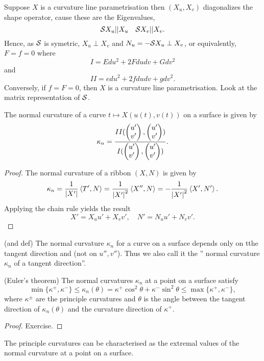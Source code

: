 \begin{remark}
	Suppose $X$ is a curvature line parametrisation then $(X_u,X_v)$ diagonalizes the shape operator, cause these are the Eigenvalues,
		\[ \mathcal S X_u || X_u \quad \mathcal S X_v || X_v. \]
	Hence, as $\mathcal S$ is symetric, $X_u \perp X_v$ and $N_u = -\mathcal S X_u \perp X_v$, or equivalently, $F = f=0$ where
		\[ I = Edu^2 + 2Fdudv + Gdv^2 \]
	and
		\[ II = edu^2 + 2fdudv + gdv^2. \]
	Conversely, if $f=F=0$, then $X$ is a curvature line parametrisation. Look at the matrix representation of $\mathcal S$.
\end{remark}

\begin{lemma}
	The normal curvature of a curve $t \mapsto X(u(t),v(t))$ on a surface is given by 
		\[ \kappa_n = \frac {II(\begin{pmatrix} u'\\v' \end{pmatrix},\begin{pmatrix} u'\\v' \end{pmatrix})}{I (\begin{pmatrix} u'\\v' \end{pmatrix},\begin{pmatrix} u'\\v' \end{pmatrix})}. \]
\end{lemma}

\begin{proof}
	The normal curvature of a ribbon $(X,N)$ is given by
		\[ \kappa_n = \frac 1{\left| X'\right|} \left \langle T',N \right\rangle = \frac 1{\left| X'\right|^2} \left \langle X'',N \right\rangle = -\frac 1{\left| X'\right|^2} \left \langle X',N' \right\rangle. \]
	Applying the chain rule yields the result
		\[ X' = X_uu' + X_vv', \quad N' = N_uu' + N_vv'. \]
\end{proof}

\begin{remark}(and def)
	The normal curvature $\kappa_n$ for a curve on a surface depends only on tthe tangent direction and (not on $u'', v''$). Thus we also call it the '' normal curvature $\kappa_n$ of a tangent direction''.
\end{remark}

\begin{theorem}(Euler's theorem)
	The normal curvatures $\kappa_n$ at a point on a surface satisfy 
		\[ \min \{ \kappa^+,\kappa^- \} \leq \kappa_n (\theta) = \kappa^+ \cos^2 \theta + \kappa^- \sin^2\theta \leq \max \{\kappa^+,\kappa^- \},  \]
	where $\kappa^\pm$ are the principle curvatures and $\theta$ is the angle between the tangent direction of $\kappa_n(\theta)$ and the curvature direction of $\kappa^+$.
\end{theorem}

\begin{proof}
	Exercise.
\end{proof}

\begin{corollary}
	The principle curvatures can be characterised as the extremal values of the normal curvature at a point on a surface.
\end{corollary}

